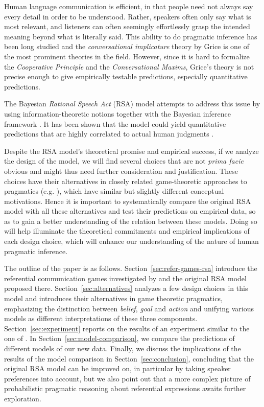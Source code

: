 Human language communication is efficient, in that people need not
always say every detail in order to be understood. Rather, speakers
often only say what is most relevant, and listeners can often
seemingly effortlessly grasp the intended meaning beyond what is
literally said. This ability to do pragmatic inference has been long
studied and the \emph{conversational implicature} theory by Grice
\cite{Grice} is one of the most prominent theories in the
field. However, since it is hard to formalize the \emph{Cooperative
  Principle} and the \emph{Conversational Maxims}, Grice's theory is
not precise enough to give empirically testable predictions,
especially quantitative predictions.

The Bayesian \emph{Rational Speech Act} (RSA) model attempts to
address this issue by using information-theoretic notions together
with the Bayesian inference framework
\cite{Frank2009,Frank,Bergen2012,GoodmanStuhlmuller2013:Knowledge-and-I}. It
has been shown that the model could yield quantitative predictions
that are highly correlated to actual human judgments
\cite{Frank,GoodmanStuhlmuller2013:Knowledge-and-I}.

Despite the RSA model's theoretical promise and empirical success, if
we analyze the design of the model, we will find several choices that
are not \emph{prima facie} obvious and might thus need further
consideration and justification. These choices have their alternatives
in closely related game-theoretic approaches to pragmatics
(e.g. \cite{Benz2007,Jager2013}), which have similar but slightly
different conceptual motivations. Hence it is important to
systematically compare the original RSA model with all these
alternatives and test their predictions on empirical data, so as to
gain a better understanding of the relation between these
models. Doing so will help illuminate the theoretical commitments and
empirical implications of each design choice, which will enhance our
understanding of the nature of human pragmatic inference.

The outline of the paper is as
follows. Section~\ref{sec:refer-games-rsa} introduce the referential
communication games investigated by \cite{Frank} and the original RSA
model proposed there. Section~\ref{sec:alternatives} analyzes a few
design choices in this model and introduces their alternatives in game
theoretic pragmatics, emphasizing the distinction between
\emph{belief}, \emph{goal} and \emph{action} and unifying various
models as different interpretations of these three
components. Section~\ref{sec:experiment} reports on the results of an
experiment similar to the one of \cite{Frank}. In
Section~\ref{sec:model-comparison}, we compare the predictions of
different models of our new data. Finally, we discuss the implications
of the results of the model comparison in
Section~\ref{sec:conclusion}, concluding that the original RSA model
can be improved on, in particular by taking speaker preferences into
account, but we also point out that a more complex picture of
probabilistic pragmatic reasoning about referential expressions awaits
further exploration.

